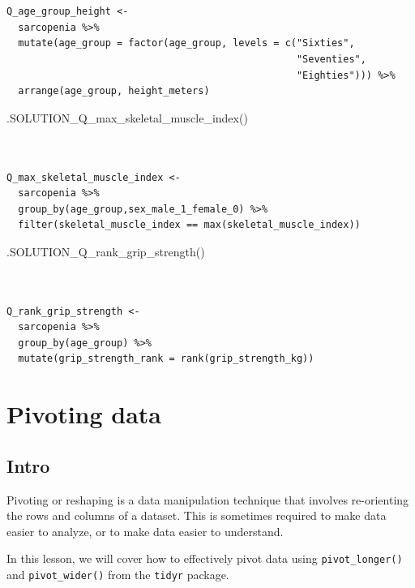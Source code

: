 \documentclass[
  letterpaper,
  DIV=11,
  numbers=noendperiod]{scrreprt}
\newenvironment{Shaded}{\begin{snugshade}}{\end{snugshade}}
\newcommand{\FunctionTok}[1]{\textcolor[rgb]{0.28,0.35,0.67}{#1}}
\newcommand{\NormalTok}[1]{\textcolor[rgb]{0.00,0.23,0.31}{#1}}
\begin{document}
\begin{verbatim}


Q_age_group_height <- 
  sarcopenia %>%
  mutate(age_group = factor(age_group, levels = c("Sixties",
                                                  "Seventies",
                                                  "Eighties"))) %>%
  arrange(age_group, height_meters)
\end{verbatim}

\begin{Shaded}
\begin{Highlighting}[]
\FunctionTok{.SOLUTION\_Q\_max\_skeletal\_muscle\_index}\NormalTok{()}
\end{Highlighting}
\end{Shaded}

\begin{verbatim}


Q_max_skeletal_muscle_index <- 
  sarcopenia %>%
  group_by(age_group,sex_male_1_female_0) %>%
  filter(skeletal_muscle_index == max(skeletal_muscle_index))
\end{verbatim}

\begin{Shaded}
\begin{Highlighting}[]
\FunctionTok{.SOLUTION\_Q\_rank\_grip\_strength}\NormalTok{()}
\end{Highlighting}
\end{Shaded}

\begin{verbatim}


Q_rank_grip_strength <- 
  sarcopenia %>%
  group_by(age_group) %>%
  mutate(grip_strength_rank = rank(grip_strength_kg))
\end{verbatim}

\chapter{Pivoting data}\label{pivoting-data}

\section{Intro}\label{intro-2}

Pivoting or reshaping is a data manipulation technique that involves
re-orienting the rows and columns of a dataset. This is sometimes
required to make data easier to analyze, or to make data easier to
understand.

In this lesson, we will cover how to effectively pivot data using
\texttt{pivot\_longer()} and \texttt{pivot\_wider()} from the
\texttt{tidyr} package.
\end{document}
